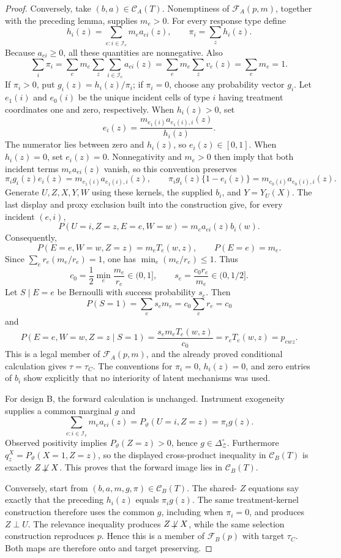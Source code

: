 \documentclass{article}
\begin{document}
\begin{proof}
Conversely, take \((b,a)\in\mathcal C_A(T)\).  Nonemptiness of \(\mathcal F_A(p,m)\), together with the preceding lemma, supplies \(m_e>0\).  For every response type define
\[
h_i(z)=\sum_{e:i\in\mathcal I_e}m_ea_{ei}(z),
\qquad
\pi_i=\sum_z h_i(z).
\]
Because \(a_{ei}\ge0\), all these quantities are nonnegative.  Also
\[
\sum_i\pi_i
=\sum_e m_e\sum_z\sum_{i\in\mathcal I_e}a_{ei}(z)
=\sum_e m_e\sum_zv_e(z)
=\sum_e m_e=1.
\]
If \(\pi_i>0\), put \(g_i(z)=h_i(z)/\pi_i\); if \(\pi_i=0\), choose any probability vector \(g_i\).  Let \(e_1(i)\) and \(e_0(i)\) be the unique incident cells of type \(i\) having treatment coordinates one and zero, respectively.  When \(h_i(z)>0\), set
\[
e_i(z)=\frac{m_{e_1(i)}a_{e_1(i),i}(z)}{h_i(z)}.
\]
The numerator lies between zero and \(h_i(z)\), so \(e_i(z)\in[0,1]\).  When \(h_i(z)=0\), set \(e_i(z)=0\).  Nonnegativity and \(m_e>0\) then imply that both incident terms \(m_ea_{ei}(z)\) vanish, so this convention preserves
\[
\pi_i g_i(z)e_i(z)=m_{e_1(i)}a_{e_1(i),i}(z),
\qquad
\pi_i g_i(z)\{1-e_i(z)\}=m_{e_0(i)}a_{e_0(i),i}(z).
\]
Generate \(U,Z,X,Y,W\) using these kernels, the supplied \(b_i\), and \(Y=Y_U(X)\).  The last display and proxy exclusion built into the construction give, for every incident \((e,i)\),
\[
P(U=i,Z=z,E=e,W=w)=m_ea_{ei}(z)b_i(w).
\]
Consequently,
\[
P(E=e,W=w,Z=z)=m_eT_e(w,z),
\qquad P(E=e)=m_e.
\]
Since \(\sum_e r_e(m_e/r_e)=1\), one has \(\min_e(m_e/r_e)\le1\).  Thus
\[
c_0=\frac12\min_e\frac{m_e}{r_e}\in(0,1],
\qquad
s_e=\frac{c_0r_e}{m_e}\in(0,1/2].
\]
Let \(S\mid E=e\) be Bernoulli with success probability \(s_e\).  Then
\[
P(S=1)=\sum_es_em_e=c_0\sum_er_e=c_0
\]
and
\[
P(E=e,W=w,Z=z\mid S=1)
=\frac{s_em_eT_e(w,z)}{c_0}
=r_eT_e(w,z)=p_{ewz}.
\]
This is a legal member of \(\mathcal F_A(p,m)\), and the already proved conditional calculation gives \(\tau=\tau_C\).  The conventions for \(\pi_i=0\), \(h_i(z)=0\), and zero entries of \(b_i\) show explicitly that no interiority of latent mechanisms was used.

For design B, the forward calculation is unchanged.  Instrument exogeneity supplies a common marginal \(g\) and
\[
\sum_{e:i\in\mathcal I_e}m_ea_{ei}(z)
=P_{\vartheta}(U=i,Z=z)=\pi_i g(z).
\]
Observed positivity implies \(P_{\vartheta}(Z=z)>0\), hence \(g\in\Delta_{\mathcal Z}^{\circ}\).  Furthermore \(q^X_z=P_{\vartheta}(X=1,Z=z)\), so the displayed cross-product inequality in \(\mathcal C_B(T)\) is exactly \(Z\not\!\perp X\).  This proves that the forward image lies in \(\mathcal C_B(T)\).

Conversely, start from \((b,a,m,g,\pi)\in\mathcal C_B(T)\).  The shared-
\(Z\) equations say exactly that the preceding \(h_i(z)\) equals \(\pi_i g(z)\).  The same treatment-kernel construction therefore uses the common \(g\), including when \(\pi_i=0\), and produces \(Z\perp U\).  The relevance inequality produces \(Z\not\!\perp X\), while the same selection construction reproduces \(p\).  Hence this is a member of \(\mathcal F_B(p)\) with target \(\tau_C\).  Both maps are therefore onto and target preserving.
\end{proof}
\end{document}
